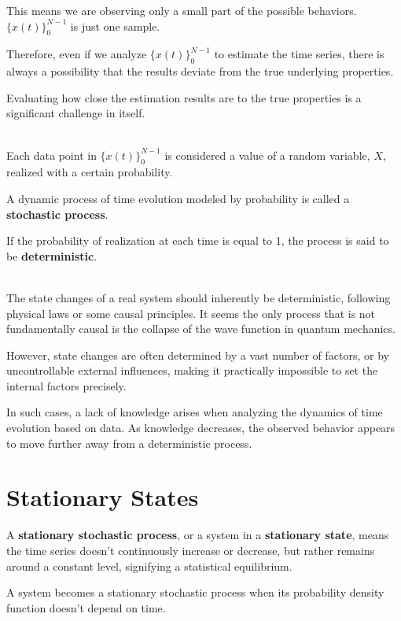 \documentclass[uplatex,a4j,12pt,dvipdfmx]{jsarticle}
\begin{document}
This means we are observing only a small part of the possible behaviors. $\{ x(t) \}^{N-1}_{0}$ is just one sample.

Therefore, even if we analyze $\{ x(t) \}^{N-1}_{0}$ to estimate the time series, there is always a possibility that the results deviate from the true underlying properties.

Evaluating how close the estimation results are to the true properties is a significant challenge in itself.

\ \\

Each data point in $\{ x(t) \}^{N-1}_{0}$ is considered a value of a random variable, $X$, realized with a certain probability.

A dynamic process of time evolution modeled by probability is called a \textbf{stochastic process}.

If the probability of realization at each time is equal to 1, the process is said to be \textbf{deterministic}.

\ \\

The state changes of a real system should inherently be deterministic, following physical laws or some causal principles. It seems the only process that is not fundamentally causal is the collapse of the wave function in quantum mechanics.

However, state changes are often determined by a vast number of factors, or by uncontrollable external influences, making it practically impossible to set the internal factors precisely.

In such cases, a lack of knowledge arises when analyzing the dynamics of time evolution based on data. As knowledge decreases, the observed behavior appears to move further away from a deterministic process.



\section{Stationary States}

A \textbf{stationary stochastic process}, or a system in a \textbf{stationary state}, means the time series doesn't continuously increase or decrease, but rather remains around a constant level, signifying a statistical equilibrium.

A system becomes a stationary stochastic process when its probability density function doesn't depend on time.
\end{document}
